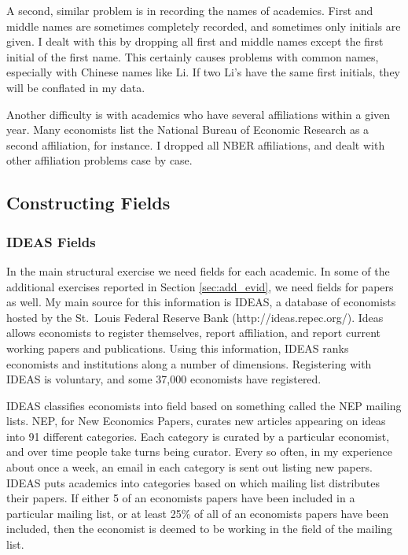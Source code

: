 A second, similar problem is in recording the names of academics. First
and middle names are sometimes completely recorded, and sometimes only
initials are given. I dealt with this by dropping all first and middle
names except the first initial of the first name. This certainly causes
problems with common names, especially with Chinese names like Li. If
two Li's have the same first initials, they will be conflated in my
data.

Another difficulty is with academics who have several affiliations within
a given year. Many economists list the National Bureau of Economic
Research as a second affiliation, for instance. I dropped all NBER
affiliations, and dealt with other affiliation problems case by case.

\subsection{Constructing Fields}

\subsubsection{IDEAS Fields}

In the main structural exercise we need fields for each academic.
In some of the additional exercises reported in Section \ref{sec:add_evid}, we need
fields for papers as well. My main source for this information is IDEAS,
a database of economists hosted by the St.~Louis Federal Reserve Bank
(http://ideas.repec.org/). Ideas allows economists to register
themselves, report affiliation, and report current working papers and
publications. Using this information, IDEAS ranks economists and
institutions along a number of dimensions. Registering with IDEAS is
voluntary, and some 37,000 economists have registered.

IDEAS classifies economists into field based on something called the NEP
mailing lists. NEP, for New Economics Papers, curates new articles
appearing on ideas into 91 different categories. Each category is
curated by a particular economist, and over time people take turns being
curator. Every so often, in my experience about once a week, an email in
each category is sent out listing new papers. IDEAS puts academics into
categories based on which mailing list distributes their papers. If
either 5 of an economists papers have been included in a particular
mailing list, or at least 25\% of all of an economists papers have been
included, then the economist is deemed to be working in the field of the
mailing list.

